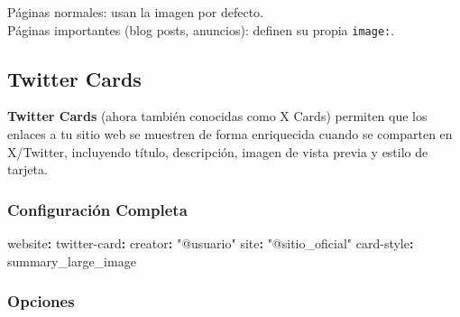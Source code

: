 \documentclass[
  doc,
  floatsintext,
  longtable,
  a4paper,
  nolmodern,
  notxfonts,
  notimes,
  12pt,
  colorlinks=true,linkcolor=blue,citecolor=blue,urlcolor=blue]{apa7}
\newenvironment{Shaded}{\begin{snugshade}}{\end{snugshade}}
\newcommand{\AttributeTok}[1]{\textcolor[rgb]{0.40,0.45,0.13}{#1}}
\newcommand{\FunctionTok}[1]{\textcolor[rgb]{0.28,0.35,0.67}{#1}}
\newcommand{\KeywordTok}[1]{\textcolor[rgb]{0.00,0.23,0.31}{\textbf{#1}}}
\newcommand{\StringTok}[1]{\textcolor[rgb]{0.13,0.47,0.30}{#1}}
\begin{document}
Páginas normales: usan la imagen por defecto.\\
Páginas importantes (blog posts, anuncios): definen su propia
\texttt{image:}.

\subsection{Twitter Cards}\label{twitter-cards}

\textbf{Twitter Cards} (ahora también conocidas como X Cards) permiten
que los enlaces a tu sitio web se muestren de forma enriquecida cuando
se comparten en X/Twitter, incluyendo título, descripción, imagen de
vista previa y estilo de tarjeta.

\subsubsection{Configuración
Completa}\label{configuraciuxf3n-completa-2}

\begin{Shaded}
\begin{Highlighting}[]
\FunctionTok{website}\KeywordTok{:}
\AttributeTok{  }\FunctionTok{twitter{-}card}\KeywordTok{:}
\AttributeTok{    }\FunctionTok{creator}\KeywordTok{:}\AttributeTok{ }\StringTok{"@usuario"}
\AttributeTok{    }\FunctionTok{site}\KeywordTok{:}\AttributeTok{ }\StringTok{"@sitio\_oficial"}
\AttributeTok{    }\FunctionTok{card{-}style}\KeywordTok{:}\AttributeTok{ summary\_large\_image}
\end{Highlighting}
\end{Shaded}

\subsubsection{Opciones}\label{opciones-1}
\end{document}
